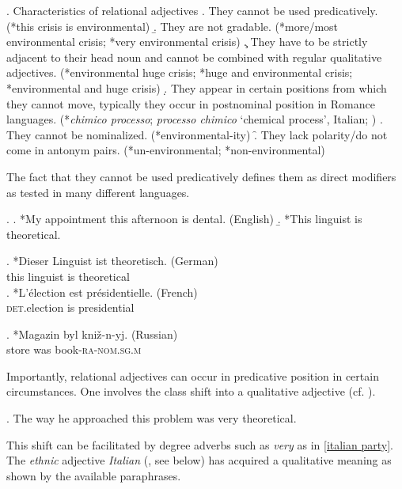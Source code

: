 \documentclass [output=book,colorlinks,citecolor=brown]{langscibook}
\begin{document}
\ex. Characteristics of relational adjectives
\a. They cannot be used predicatively. (*this crisis is environmental)
\b. They are not gradable. (*more/most environmental crisis; *very environmental crisis)
\c. They have to be strictly adjacent to their head noun and cannot be combined with regular qualitative adjectives. (*environmental huge crisis; *huge and environmental crisis; *environmental and huge crisis)
\d. They appear in certain positions from which they cannot move, typically they occur in postnominal position in Romance languages. (*\textit{chimico processo}; \textit{processo chimico} `chemical process', Italian; \citealt[59]{bortolotto:2016:RA})
\e. They cannot be nominalized. (*environmental-ity)
\f. They lack polarity/do not come in antonym pairs. (*un-environmental; *non-environmental)

The fact that they cannot be used predicatively defines them as direct modifiers as tested in many different languages. %


\ex. \a. *My appointment this afternoon is dental. (English) \null \hfill \citep[49]{rae:2010:ordering}
\b. *This linguist is theoretical.

\exg. *Dieser Linguist ist theoretisch. (German)\\
this linguist is theoretical \\

\exg. *L’élection est présidentielle. (French)\\
\textsc{det}.election is presidential \\\null \hfill \citep[68]{bortolotto:2016:RA}

\exg. *Magazin byl kni\v{z}-n-yj. (Russian)\\
store was book-\textsc{ra-nom.sg.m} \\ \null \hfill \citep[100]{mezhevich:2002:english}

Importantly, relational adjectives can occur in predicative position in certain circumstances. One involves the class shift into a qualitative adjective (cf. \citealt{nagano:2018:conversion}). %

\ex. The way he approached this problem was very theoretical.

This shift can be facilitated by degree adverbs such as \textit{very} as in \ref{italian party}. The \textit{ethnic} adjective \textit{Italian} (\citealt{alex:2011:ea}, see below) has acquired a qualitative meaning as shown by the available paraphrases.
\end{document}
